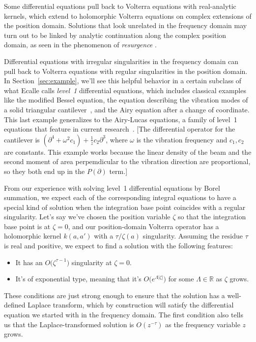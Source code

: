 \documentclass{article}
\theoremstyle{plain}
\newcommand{\R}{\mathbb{R}}
\newenvironment{verify}{\color{ForestGreen}}{\color{black}}
\begin{document}
Some differential equations pull back to Volterra equations with real-analytic kernels, which extend to holomorphic Volterra equations on complex extensions of the position domain. Solutions that look unrelated in the frequency domain may turn out to be linked by analytic continuation along the complex position domain, as seen in the phenomenon of {\em resurgence} \cite{EcalleIII}\cite{lectures-marino}\cite[Section 2.4]{sternin1995borel}.

Differential equations with irregular singularities in the frequency domain can pull back to Volterra equations with regular singularities in the position domain. In Section~\ref{sec:example}, we'll see this helpful behavior in a certain subclass of what Ecalle calls {\em level~1} differential equations, which includes classical examples like the modified Bessel equation, the equation describing the vibration modes of a solid triangular cantilever~\cite[from Equation~12.58]{genta2009vibration}, and the Airy equation after a change of coordinate. This last example generalizes to the Airy-Lucas equations, a family of level~1 equations that feature in current research~\cite[Equations 3.2]{charbonnier22}.
\begin{verify}
[The differential operator for the cantilever is $(\partial^4 + \omega^2 c_1) + \tfrac{1}{z} c_2 \partial^3$, where $\omega$ is the vibration frequency and $c_1, c_2$ are constants. This example works because the linear density of the beam and the second moment of area perpemdicular to the vibration direction are proportional, so they both end up in the $P(\partial)$ term.]\end{verify}

From our experience with solving level~1 differential equations by Borel summation, we expect each of the corresponding integral equations to have a special kind of solution when the integration base point coincides with a regular singularity. Let's say we've chosen the position variable $\zeta$ so that the integration base point is at $\zeta = 0$, and our position-domain Volterra operator has a holomorphic kernel $k(a, a')$ with a $\tau/\zeta(a)$ singularity. Assuming the residue $\tau$ is real and positive, we expect to find a solution with the following features:
\begin{itemize}
\item It has an $O\big(\zeta^{\tau-1}\big)$ singularity at $\zeta = 0$.
\item It's of exponential type, meaning that it's $O\big(e^{\Lambda|\zeta|}\big)$ for some $\Lambda \in \R$ as $\zeta$ grows.
\end{itemize}
These conditions are just strong enough to ensure that the solution has a well-defined Laplace transform, which by construction will satisfy the differential equation we started with in the frequency domain. The first condition also tells us that the Laplace-transformed solution is $O(z^{-\tau})$ as the frequency variable $z$ grows.
\end{document}

